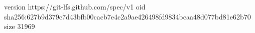 version https://git-lfs.github.com/spec/v1
oid sha256:627b9d379c7d43bfb00cacb7e4c2a9ae426498fd9834bcaa48d077bd81e62b70
size 31969
